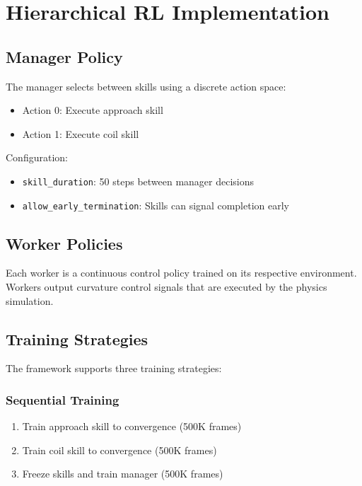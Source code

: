 \documentclass[11pt]{article}
\begin{document}
\section{Hierarchical RL Implementation}

\subsection{Manager Policy}

The manager selects between skills using a discrete action space:
\begin{itemize}
    \item Action 0: Execute approach skill
    \item Action 1: Execute coil skill
\end{itemize}

Configuration:
\begin{itemize}
    \item \texttt{skill\_duration}: 50 steps between manager decisions
    \item \texttt{allow\_early\_termination}: Skills can signal completion early
\end{itemize}

\subsection{Worker Policies}

Each worker is a continuous control policy trained on its respective environment. Workers output curvature control signals that are executed by the physics simulation.

\subsection{Training Strategies}

The framework supports three training strategies:

\subsubsection{Sequential Training}
\begin{enumerate}
    \item Train approach skill to convergence (500K frames)
    \item Train coil skill to convergence (500K frames)
    \item Freeze skills and train manager (500K frames)
\end{enumerate}
\end{document}
